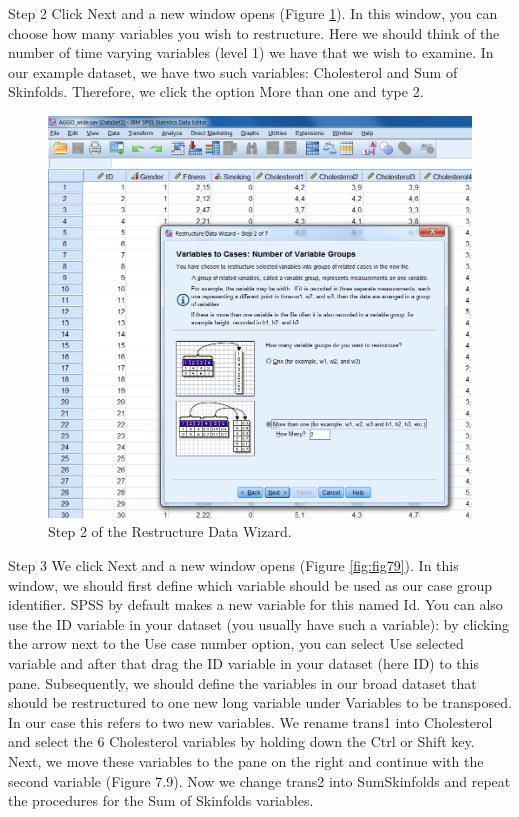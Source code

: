 \documentclass[]{book}
\begin{document}
Step 2 Click Next and a new window opens (Figure \ref{fig:fig78}). In
this window, you can choose how many variables you wish to restructure.
Here we should think of the number of time varying variables (level 1)
we have that we wish to examine. In our example dataset, we have two
such variables: Cholesterol and Sum of Skinfolds. Therefore, we click
the option More than one and type 2.

\begin{figure}

{\centering \includegraphics[width=0.9\linewidth]{images/fig7.8} 

}

\caption{Step 2 of the Restructure Data Wizard.}\label{fig:fig78}
\end{figure}

Step 3 We click Next and a new window opens (Figure \ref{fig:fig79}). In
this window, we should first define which variable should be used as our
case group identifier. SPSS by default makes a new variable for this
named Id. You can also use the ID variable in your dataset (you usually
have such a variable): by clicking the arrow next to the Use case number
option, you can select Use selected variable and after that drag the ID
variable in your dataset (here ID) to this pane. Subsequently, we should
define the variables in our broad dataset that should be restructured to
one new long variable under Variables to be transposed. In our case this
refers to two new variables. We rename trans1 into Cholesterol and
select the 6 Cholesterol variables by holding down the Ctrl or Shift
key. Next, we move these variables to the pane on the right and continue
with the second variable (Figure 7.9). Now we change trans2 into
SumSkinfolds and repeat the procedures for the Sum of Skinfolds
variables.
\end{document}
